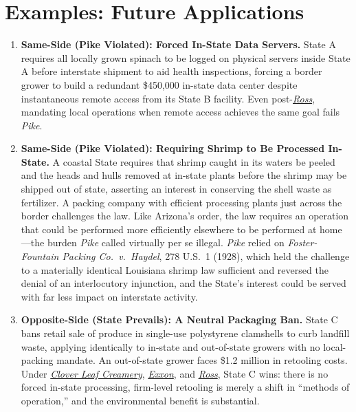 \documentclass[12pt]{article}
\begin{document}
\section{Examples: Future Applications}
\begin{enumerate}

\item \textbf{Same-Side (Pike Violated): Forced In-State Data Servers.} State A requires all locally grown spinach to be logged on physical servers inside State A before interstate shipment to aid health inspections, forcing a border grower to build a redundant \$450,000 in-state data center despite instantaneous remote access from its State B facility. Even post-\href{https://www.law.cornell.edu/supremecourt/text/21-468}{\textit{Ross}}, mandating local operations when remote access achieves the same goal fails \textit{Pike}.

\item \textbf{Same-Side (Pike Violated): Requiring Shrimp to Be Processed In-State.} A coastal State requires that shrimp caught in its waters be peeled and the heads and hulls removed at in-state plants before the shrimp may be shipped out of state, asserting an interest in conserving the shell waste as fertilizer. A packing company with efficient processing plants just across the border challenges the law. Like Arizona's order, the law requires an operation that could be performed more efficiently elsewhere to be performed at home---the burden \textit{Pike} called virtually per se illegal. \textit{Pike} relied on \textit{Foster-Fountain Packing Co.\ v.\ Haydel}, 278 U.S.\ 1 (1928), which held the challenge to a materially identical Louisiana shrimp law sufficient and reversed the denial of an interlocutory injunction, and the State's interest could be served with far less impact on interstate activity.

\item \textbf{Opposite-Side (State Prevails): A Neutral Packaging Ban.} State C bans retail sale of produce in single-use polystyrene clamshells to curb landfill waste, applying identically to in-state and out-of-state growers with no local-packing mandate. An out-of-state grower faces \$1.2 million in retooling costs. Under \href{https://supreme.justia.com/cases/federal/us/449/456/}{\textit{Clover Leaf Creamery}}, \href{https://supreme.justia.com/cases/federal/us/437/117/}{\textit{Exxon}}, and \href{https://www.law.cornell.edu/supremecourt/text/21-468}{\textit{Ross}}, State C wins: there is no forced in-state processing, firm-level retooling is merely a shift in ``methods of operation,'' and the environmental benefit is substantial.


\end{enumerate}
\end{document}
